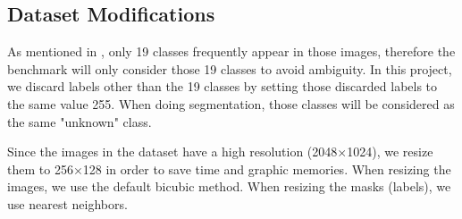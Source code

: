 \documentclass[10pt,twocolumn,letterpaper]{article}
\begin{document}
\subsection{Dataset Modifications}
As mentioned in \cite{Cordts2016Cityscapes}, only 19 classes frequently appear in those images, therefore the benchmark will only consider those 19 classes to avoid ambiguity. In this project, we discard labels other than the 19 classes by setting those discarded labels to the same value 255. When doing segmentation, those classes will be considered as the same "unknown" class.

Since the images in the dataset have a high resolution (2048$\times$1024), we resize them to 256$\times$128 in order to save time and graphic memories. When resizing the images, we use the default bicubic method. When resizing the masks (labels), we use nearest neighbors.


{\small


}
\end{document}
